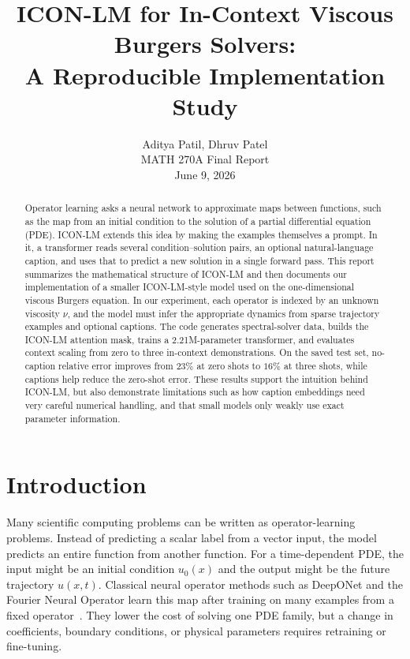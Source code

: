 \documentclass[11pt]{article}
\title{\vspace{-1.5em}
  ICON-LM for In-Context Viscous Burgers Solvers:\\
  A Reproducible Implementation Study}
\author{
  Aditya Patil, Dhruv Patel\\
  \small MATH 270A Final Report\\
  \small June 9, 2026
}
\date{}
\begin{document}
\maketitle
\vspace{-2em}

\begin{abstract}
\noindent
Operator learning asks a neural network to approximate maps between functions, such
as the map from an initial condition to the solution of a partial differential equation (PDE). ICON-LM extends this idea by making the examples themselves a prompt. In it,
a transformer reads several condition--solution pairs, an optional natural-language
caption, and uses that to predict a new solution in a single forward pass. This report 
summarizes the mathematical structure of ICON-LM and then documents our
implementation of a smaller ICON-LM-style model used on the one-dimensional viscous
Burgers equation. In our experiment, each operator is indexed by an unknown
viscosity $\nu$, and the model must infer the appropriate dynamics from sparse
trajectory examples and optional captions. The code generates spectral-solver data,
builds the ICON-LM attention mask, trains a 2.21M-parameter transformer, and
evaluates context scaling from zero to three in-context demonstrations. On the
saved test set, no-caption relative error improves from $23\%$ at zero shots to
$16\%$ at three shots, while captions help reduce the zero-shot error. These results
support the intuition behind ICON-LM, but also demonstrate limitations such as how caption embeddings need very careful numerical handling, and that small models only weakly use exact parameter information.
\end{abstract}

\section{Introduction}
\label{sec:intro}

Many scientific computing problems can be written as operator-learning problems.
Instead of predicting a scalar label from a vector input, the model predicts an
entire function from another function. For a time-dependent PDE, the input might be
an initial condition $u_0(x)$ and the output might be the future trajectory
$u(x,t)$. Classical neural operator methods such as DeepONet and the Fourier
Neural Operator learn this map after training on many examples from a fixed
operator~\citep{lu2021deeponet,li2021fourier,kovachki2023neural}. They lower
the cost of solving one PDE family, but a change in coefficients, boundary
conditions, or physical parameters requires retraining or fine-tuning.
\end{document}
